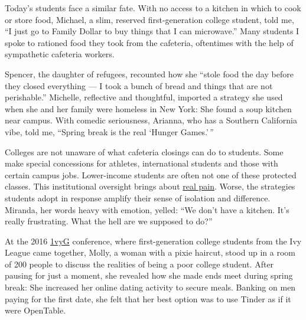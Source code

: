 Today's students face a similar fate. With no access to a kitchen in
which to cook or store food, Michael, a slim, reserved first-generation
college student, told me, ``I just go to Family Dollar to buy things
that I can microwave.'' Many students I spoke to rationed food they took
from the cafeteria, oftentimes with the help of sympathetic cafeteria
workers.

Spencer, the daughter of refugees, recounted how she ``stole food the
day before they closed everything --- I took a bunch of bread and things
that are not perishable.'' Michelle, reflective and thoughtful, imported
a strategy she used when she and her family were homeless in New York:
She found a soup kitchen near campus. With comedic seriousness, Arianna,
who has a Southern California vibe, told me, ``Spring break is the real
`Hunger Games.'\emph{''}

Colleges are not unaware of what cafeteria closings can do to students.
Some make special concessions for athletes, international students and
those with certain campus jobs. Lower-income students are often not one
of these protected classes. This institutional oversight brings about
\href{https://www.washingtonpost.com/local/education/for-the-poor-in-the-ivy-league-a-full-ride-isnt-always-what-they-imagined/2016/05/16/5f89972a-114d-11e6-81b4-581a5c4c42df_story.html?utm_term=.e90c56a36e1b}{real
pain}. Worse, the strategies students adopt in response amplify their
sense of isolation and difference. Miranda, her words heavy with
emotion, yelled: ``We don't have a kitchen. It's really frustrating.
What the hell are we supposed to do?''

At the 2016 \href{http://www.1vyg.org}{1vyG} conference, where
first-generation college students from the Ivy League came together,
Molly, a woman with a pixie haircut, stood up in a room of 200 people to
discuss the realities of being a poor college student. After pausing for
just a moment, she revealed how she made ends meet during spring break:
She increased her online dating activity to secure meals. Banking on men
paying for the first date, she felt that her best option was to use
Tinder as if it were OpenTable.

